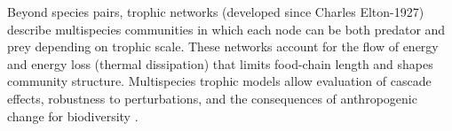 \documentclass[10pt, a4paper]{amsart}
\theoremstyle{plain}
\theoremstyle{definition}
\theoremstyle{remark}
\numberwithin{equation}{section}
\begin{document}
Beyond species pairs, trophic networks (developed since  Charles Elton-1927) describe multispecies communities in which each node can be both predator and prey depending on trophic scale. These networks account for the flow of energy and energy loss (thermal dissipation) that limits food-chain length and shapes community structure. Multispecies trophic models allow evaluation of cascade effects, robustness to perturbations, and the consequences of anthropogenic change for biodiversity \cite{ref55,ref56,ref30}.
\end{document}
